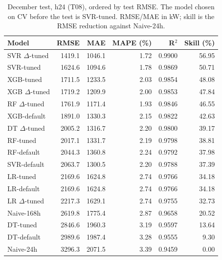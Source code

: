 \begin{table}[H]\centering\small
\caption{December test, h24 (T08), ordered by test RMSE. The model chosen on CV before the test is SVR-tuned. RMSE/MAE in kW; skill is the RMSE reduction against Naive-24h.}\label{tab:test24}
\setlength{\tabcolsep}{4pt}
\begin{tabular}{lrrrrr}
\toprule
Model & RMSE & MAE & MAPE (\%) & R$^2$ & Skill (\%) \\
\midrule
SVR $\Delta$-tuned & \num{1419.1} & \num{1046.1} & \num{1.72} & \num{0.9900} & \num{56.95} \\
SVR-tuned & \num{1624.6} & \num{1094.6} & \num{1.78} & \num{0.9869} & \num{50.71} \\
XGB-tuned & \num{1711.5} & \num{1233.5} & \num{2.03} & \num{0.9854} & \num{48.08} \\
XGB $\Delta$-tuned & \num{1719.2} & \num{1209.9} & \num{2.00} & \num{0.9853} & \num{47.84} \\
RF $\Delta$-tuned & \num{1761.9} & \num{1171.4} & \num{1.93} & \num{0.9846} & \num{46.55} \\
XGB-default & \num{1891.0} & \num{1330.3} & \num{2.15} & \num{0.9822} & \num{42.63} \\
DT $\Delta$-tuned & \num{2005.2} & \num{1316.7} & \num{2.20} & \num{0.9800} & \num{39.17} \\
RF-tuned & \num{2017.1} & \num{1331.7} & \num{2.19} & \num{0.9798} & \num{38.81} \\
RF-default & \num{2044.3} & \num{1360.8} & \num{2.24} & \num{0.9792} & \num{37.98} \\
SVR-default & \num{2063.7} & \num{1300.5} & \num{2.20} & \num{0.9788} & \num{37.39} \\
LR-tuned & \num{2169.6} & \num{1624.8} & \num{2.74} & \num{0.9766} & \num{34.18} \\
LR-default & \num{2169.6} & \num{1624.8} & \num{2.74} & \num{0.9766} & \num{34.18} \\
LR $\Delta$-tuned & \num{2217.3} & \num{1629.1} & \num{2.74} & \num{0.9755} & \num{32.73} \\
Naive-168h & \num{2619.8} & \num{1775.4} & \num{2.87} & \num{0.9658} & \num{20.52} \\
DT-tuned & \num{2846.6} & \num{1960.3} & \num{3.19} & \num{0.9597} & \num{13.64} \\
DT-default & \num{2989.6} & \num{1987.4} & \num{3.28} & \num{0.9555} & \num{9.30} \\
Naive-24h & \num{3296.3} & \num{2071.5} & \num{3.39} & \num{0.9459} & \num{0.00} \\
\bottomrule\end{tabular}
\end{table}
